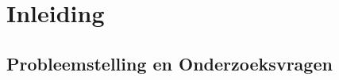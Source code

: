 
\chapter{Inleiding}
\label{ch:inleiding}

\section{Probleemstelling en Onderzoeksvragen}
\label{sec:onderzoeksvragen}

